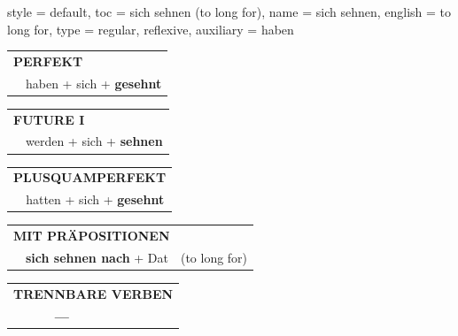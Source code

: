 \begin{verbentry}{
  style = {default},
  toc = {sich sehnen (to long for)},
  name = {sich sehnen},
  english = {to long for},
  type = {regular, reflexive},
  auxiliary = {haben}
}
 \begin{tabular}{rl}
     \multicolumn{2}{l}{\textbf{PERFEKT}}\\
   & haben + sich + \textbf{gesehnt}\\
  \end{tabular}
\hfill
   \begin{tabular}{rl}
    \multicolumn{2}{l}{\textbf{FUTURE I} }\\
   & werden + sich + \textbf{sehnen}\\
  \end{tabular}
\hfill
   \begin{tabular}{rl}
      \multicolumn{2}{l}{\textbf{PLUSQUAMPERFEKT}}\\
   & hatten + sich + \textbf{gesehnt}\\
  \end{tabular}

   \vspace{10pt}

   \begin{tabular}{lll}
      \multicolumn{3}{l}{\textbf{MIT PRÄPOSITIONEN}}\\
& \textbf{sich sehnen nach} + Dat & (to long for)\\
\end{tabular}
  \hfill
   \begin{tabular}{lll}
\multicolumn{3}{l}{\textbf{TRENNBARE VERBEN}}\\
& \textbf{---} & \\
\end{tabular}

  \vspace{-5pt}
\end{verbentry}

